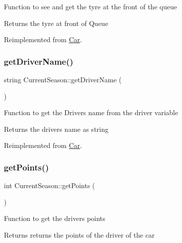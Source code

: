 Function to see and get the tyre at the front of the queue \begin{DoxyReturn}{Returns}
the tyre at front of Queue 
\end{DoxyReturn}


Reimplemented from \hyperlink{classCar_aadd6f69cf389b293a5e8a098ebc75f1d}{Car}.

\mbox{\label{classCurrentSeason_a3b8912ef6e838fe0a4d735ffc4cd7b66}} 
\subsubsection{\texorpdfstring{get\+Driver\+Name()}{getDriverName()}}
{\footnotesize\ttfamily string Current\+Season\+::get\+Driver\+Name (\begin{DoxyParamCaption}{ }\end{DoxyParamCaption})\hspace{0.3cm}{\ttfamily [virtual]}}

Function to get the Drivers name from the driver variable \begin{DoxyReturn}{Returns}
the drivers name as string 
\end{DoxyReturn}


Reimplemented from \hyperlink{classCar_a0192991111c42f7cba809cc9831cd5f3}{Car}.

\mbox{\label{classCurrentSeason_acea90ff7b0349785b189199d76b9a9a0}} 
\subsubsection{\texorpdfstring{get\+Points()}{getPoints()}}
{\footnotesize\ttfamily int Current\+Season\+::get\+Points (\begin{DoxyParamCaption}{ }\end{DoxyParamCaption})\hspace{0.3cm}{\ttfamily [virtual]}}

Function to get the drivers points \begin{DoxyReturn}{Returns}
returns the points of the driver of the car 
\end{DoxyReturn}


